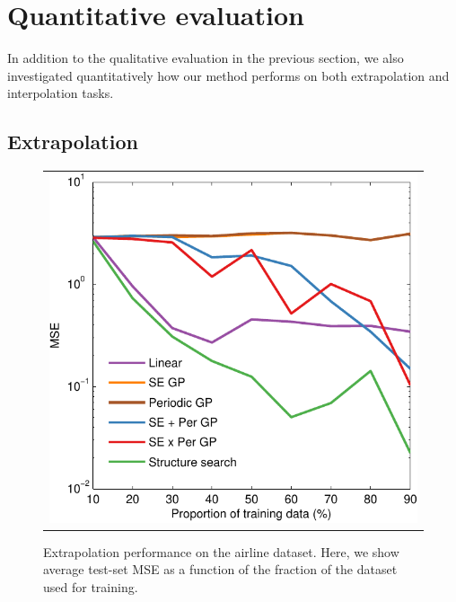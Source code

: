 \documentclass[twoside]{article}
\begin{document}

\section{Quantitative evaluation}

In addition to the qualitative evaluation in the previous section, we also investigated quantitatively how our method performs on both extrapolation and interpolation tasks.

\subsection{Extrapolation}

\begin{figure}[h!]
\centering
\begin{tabular}{c}
\hspace{-0.5cm} \includegraphics[width=0.95\columnwidth]{../figures/extrapolation_curves/01-airline-s-ex-curve_hint.pdf}
\end{tabular}
\caption{Extrapolation performance on the airline dataset.  Here, we show average test-set MSE as a function of the fraction of the dataset used for training. 
}
\label{fig:extrapolation}
\end{figure}
\end{document}

